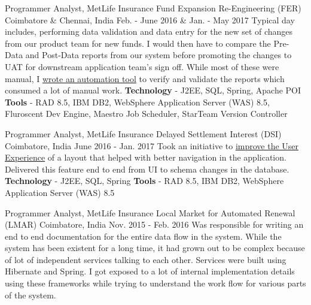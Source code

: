 \begin{cventries}
  \cventry
    {Programmer Analyst, MetLife Insurance} %
    {Fund Expansion Re-Engineering (FER)} %
    {Coimbatore \& Chennai, India} %
    {Feb. - June 2016 \& Jan. - May 2017} %
    {
        Typical day includes, performing data validation and data entry for the new set of changes from our product team for new funds. I would then have to compare the Pre-Data and Post-Data reports from our system before promoting the changes to UAT for downstream application team's sign off. While most of these were manual, I \underline{wrote an automation tool} to verify and validate the reports which consumed a lot of manual work.
        \newline
        \textbf{Technology} - J2EE, SQL, Spring, Apache POI \newline
        \textbf{Tools} - RAD 8.5, IBM DB2, WebSphere Application Server (WAS) 8.5, Fluroscent Dev Engine, Maestro Job Scheduler, StarTeam Version Controller
    }

  \cventry
    {Programmer Analyst, MetLife Insurance} %
    {Delayed Settlement Interest (DSI)} %
    {Coimbatore, India} %
    {June 2016 - Jan. 2017} %
    {
        Took an initiative to \underline{improve the User Experience} of a layout that helped with better navigation in the application. Delivered this feature end to end from UI to schema changes in the database. 
        \newline
        \textbf{Technology} - J2EE, SQL, Spring \newline
        \textbf{Tools} - RAD 8.5, IBM DB2, WebSphere Application Server (WAS) 8.5
    }

  \cventry
    {Programmer Analyst, MetLife Insurance} %
    {Local Market for Automated Renewal (LMAR)} %
    {Coimbatore, India} %
    {Nov. 2015 - Feb. 2016} %
    {
        Was responsible for writing an end to end documentation for the entire data flow in the system. While the system has been existent for a long time, it had grown out to be complex because of lot of independent services talking to each other. Services were built using Hibernate and Spring. I got exposed to a lot of internal implementation details using these frameworks while trying to understand the work flow for various parts of the system.
    }


\end{cventries}
